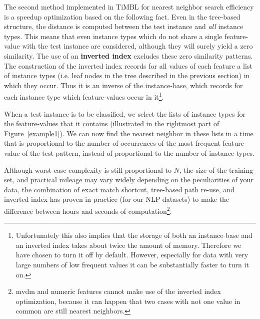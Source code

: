 \documentclass{report}
\begin{document}
The second method implemented in TiMBL for nearest neighbor search
efficiency is a speedup optimization based on the following fact. Even
in the tree-based structure, the distance is computed between the test
instance and {\em all} instance types. This means that even instance
types which do not share a single feature-value with the test instance
are considered, although they will surely yield a zero similarity. The
use of an {\bf inverted index} excludes these zero similarity
patterns.  The construction of the inverted index records for all
values of each feature a list of instance types (i.e. leaf nodes in
the tree described in the previous section) in which they occur. Thus
it is an inverse of the instance-base, which records for each instance
type which feature-values occur in it\footnote{Unfortunately this also
implies that the storage of both an instance-base and an inverted
index takes about twice the amount of memory. Therefore we have chosen
to turn it off by default. However, especially for data with very
large numbers of low frequent values it can be substantially faster to
turn it on.}.

When a test instance is to be classified, we select the lists of
instance types for the feature-values that it contains (illustrated in
the rightmost part of Figure~\ref{example1}). We can now find the
nearest neighbor in these lists in a time that is proportional to the
number of occurrences of the most frequent feature-value of the test
pattern, instead of proportional to the number of instance types.

Although worst case complexity is still proportional to $N$, the size
of the training set, and practical mileage may vary widely depending
on the peculiarities of your data, the combination of exact match
shortcut, tree-based path re-use, and inverted index has proven in
practice (for our NLP datasets) to make the difference between hours
and seconds of computation\footnote{{\sc mvdm} and numeric features
cannot make use of the inverted index optimization, because it can
happen that two cases with not one value in common are still nearest
neighbors. 
%
}.
\end{document}
